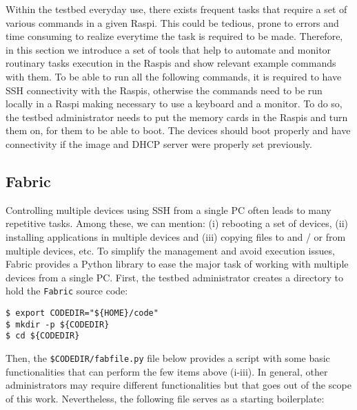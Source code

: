 
\label{sec:tools}
Within the testbed everyday use, there exists frequent tasks that require
a set of various commands in a given \ac{Raspi}. This could be tedious, prone
to errors and time consuming to realize everytime the task is required to be
made. Therefore, in this section we introduce a set of tools that help to
automate and monitor routinary tasks execution in the \ac{Raspi}s and show
relevant example commands with them. To be able to run all the following
commands, it is required to have \ac{SSH} connectivity with the \ac{Raspi}s,
otherwise the commands need to be run locally in a \ac{Raspi} making
necessary to use a keyboard and a monitor. To do so, the testbed
administrator needs to put the memory cards in the \ac{Raspi}s and turn them
on, for them to be able to boot. The devices should boot properly and have
connectivity if the image and \ac{DHCP} server were properly set previously.


\subsection{Fabric}
Controlling multiple devices using \ac{SSH} from a single \ac{PC}
often leads to many repetitive tasks. Among these, we can mention:
(i) rebooting a set of devices, (ii) installing applications in multiple
devices and (iii) copying files to and / or from multiple devices, etc. To
simplify the management and avoid execution issues, Fabric provides
a Python library to ease the major task of working with multiple devices from
a single \ac{PC}. First, the testbed administrator creates a directory to
hold the \texttt{Fabric} source code:

\begin{lstlisting}[]
$ export CODEDIR="${HOME}/code"
$ mkdir -p ${CODEDIR}
$ cd ${CODEDIR}
\end{lstlisting}
\FloatBarrier
\vspace{-5mm}

Then, the \texttt{\$CODEDIR/fabfile.py} file below provides a script with
some basic functionalities that can perform the few items above (i-iii).
In general, other administrators may require different functionalities
but that goes out of the scope of this work. Nevertheless, the following
file serves as a starting boilerplate:

